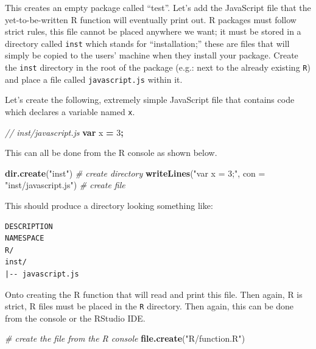 \documentclass[
]{krantz}
\makeatletter
\newenvironment{Shaded}{\begin{snugshade}}{\end{snugshade}}
\newcommand{\CommentTok}[1]{\textcolor[rgb]{0.37,0.37,0.37}{\textit{#1}}}
\newcommand{\DataTypeTok}[1]{\textcolor[rgb]{0.27,0.27,0.27}{#1}}
\newcommand{\DecValTok}[1]{\textcolor[rgb]{0.06,0.06,0.06}{#1}}
\newcommand{\KeywordTok}[1]{\textcolor[rgb]{0.27,0.27,0.27}{\textbf{#1}}}
\newcommand{\NormalTok}[1]{#1}
\newcommand{\OperatorTok}[1]{\textcolor[rgb]{0.43,0.43,0.43}{\textbf{#1}}}
\newcommand{\StringTok}[1]{\textcolor[rgb]{0.5,0.5,0.5}{#1}}
\newenvironment{kframe}{%
\medskip{}
\setlength{\fboxsep}{.8em}
 \def\at@end@of@kframe{}%
 \ifinner\ifhmode%
  \def\at@end@of@kframe{\end{minipage}}%
  \begin{minipage}{\columnwidth}%
 \fi\fi%
 \def\FrameCommand##1{\hskip\@totalleftmargin \hskip-\fboxsep
 \colorbox{shadecolor}{##1}\hskip-\fboxsep
     \hskip-\linewidth \hskip-\@totalleftmargin \hskip\columnwidth}%
 \MakeFramed {\advance\hsize-\width
   \@totalleftmargin\z@ \linewidth\hsize
   \@setminipage}}%
 {\par\unskip\endMakeFramed%
 \at@end@of@kframe}
\renewenvironment{Shaded}{\begin{kframe}}{\end{kframe}}
\makeatother
\begin{document}
This creates an empty package called ``test''. Let's add the JavaScript file that the yet-to-be-written R function will eventually print out. R packages must follow strict rules, this file cannot be placed anywhere we want; it must be stored in a directory called \texttt{inst} which stands for ``installation;'' these are files that will simply be copied to the users' machine when they install your package. Create the \texttt{inst} directory in the root of the package (e.g.: next to the already existing \texttt{R}) and place a file called \texttt{javascript.js} within it.

Let's create the following, extremely simple JavaScript file that contains code which declares a variable named \texttt{x}.

\begin{Shaded}
\begin{Highlighting}[]
\CommentTok{// inst/javascript.js}
\KeywordTok{var}\NormalTok{ x }\OperatorTok{=} \DecValTok{3}\OperatorTok{;}
\end{Highlighting}
\end{Shaded}

This can all be done from the R console as shown below.

\begin{Shaded}
\begin{Highlighting}[]
\KeywordTok{dir.create}\NormalTok{(}\StringTok{"inst"}\NormalTok{) }\CommentTok{\# create directory}
\KeywordTok{writeLines}\NormalTok{(}\StringTok{"var x = 3;"}\NormalTok{, }\DataTypeTok{con =} \StringTok{"inst/javascript.js"}\NormalTok{) }\CommentTok{\# create file}
\end{Highlighting}
\end{Shaded}

This should produce a directory looking something like:

\begin{verbatim}
DESCRIPTION
NAMESPACE
R/
inst/
|-- javascript.js
\end{verbatim}

Onto creating the R function that will read and print this file. Then again, R is strict, R files must be placed in the \texttt{R} directory. Then again, this can be done from the console or the RStudio IDE.

\begin{Shaded}
\begin{Highlighting}[]
\CommentTok{\# create the file from the R console}
\KeywordTok{file.create}\NormalTok{(}\StringTok{"R/function.R"}\NormalTok{)}
\end{Highlighting}
\end{Shaded}
\end{document}
